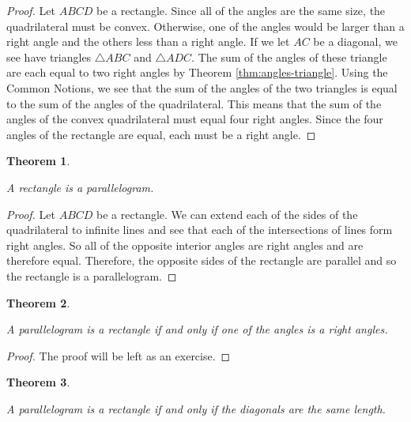 \documentclass[
]{book}
\newtheorem{theorem}{Theorem}[chapter]
\theoremstyle{definition}
\theoremstyle{definition}
\theoremstyle{definition}
\theoremstyle{definition}
\theoremstyle{remark}
\begin{document}
\begin{proof}

Let \(ABCD\) be a rectangle. Since all of the angles are the same size, the quadrilateral must be convex. Otherwise, one of the angles would be larger than a right angle and the others less than a right angle. If we let \(AC\) be a diagonal, we see have triangles \(\triangle ABC\) and \(\triangle ADC\). The sum of the angles of these triangle are each equal to two right angles by Theorem \ref{thm:angles-triangle}. Using the Common Notions, we see that the sum of the angles of the two triangles is equal to the sum of the angles of the quadrilateral. This means that the sum of the angles of the convex quadrilateral must equal four right angles. Since the four angles of the rectangle are equal, each must be a right angle.

\end{proof}

\begin{theorem}
\protect\hypertarget{thm:unlabeled-div-166}{}\label{thm:unlabeled-div-166}

A rectangle is a parallelogram.

\end{theorem}

\begin{proof}

Let \(ABCD\) be a rectangle. We can extend each of the sides of the quadrilateral to infinite lines and see that each of the intersections of lines form right angles. So all of the opposite interior angles are right angles and are therefore equal. Therefore, the opposite sides of the rectangle are parallel and so the rectangle is a parallelogram.

\end{proof}

\begin{theorem}
\protect\hypertarget{thm:rectangle-angle}{}\label{thm:rectangle-angle}

A parallelogram is a rectangle if and only if one of the angles is a right angles.

\end{theorem}

\begin{proof}

The proof will be left as an exercise.

\end{proof}

\begin{theorem}
\protect\hypertarget{thm:unlabeled-div-169}{}\label{thm:unlabeled-div-169}

A parallelogram is a rectangle if and only if the diagonals are the same length.

\end{theorem}
\end{document}
